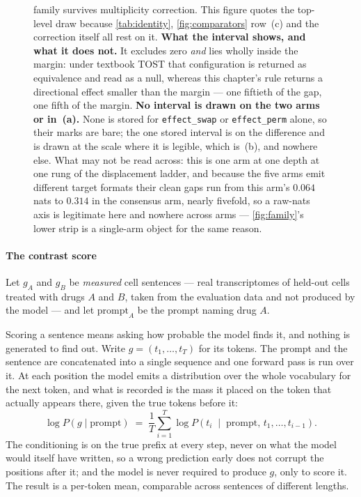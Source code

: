 \begin{figure}[htbp]
{family survives multiplicity correction. This figure quotes the top-level draw
because \cref{tab:identity}, \cref{fig:comparators} row~(c) and the correction
itself all rest on it. \textbf{What the interval shows, and what it does not.}
It excludes zero \emph{and} lies wholly inside the margin: under textbook TOST
that configuration is returned as equivalence and read as a null, whereas this
chapter's rule returns a directional effect smaller than the margin --- one
fiftieth of the gap, one fifth of the margin. \textbf{No interval is drawn on
the two arms or in~(a).} None is stored for \texttt{effect\_swap} or
\texttt{effect\_perm} alone, so their marks are bare; the one stored interval
is on the difference and is drawn at the scale where it is legible, which
is~(b), and nowhere else. What may not be read across: this is one arm at one
depth at one rung of the displacement ladder, and because the five arms emit
different target formats their clean gaps run from this arm's $0.064$ nats to
$0.314$ in the consensus arm, nearly fivefold, so a raw-nats axis is legitimate
here and nowhere across arms --- \cref{fig:family}'s lower strip is a
single-arm object for the same reason.}
\label{fig:materiality}
\end{figure}

\paragraph{The contrast score} Let $g_A$ and $g_B$ be \emph{measured} cell
sentences --- real transcriptomes of held-out cells treated with drugs $A$ and
$B$, taken from the evaluation data and not produced by the model --- and let
$\textrm{prompt}_A$ be the prompt naming drug $A$.

Scoring a sentence means asking how probable the model finds it, and nothing is
generated to find out. Write $g = (t_1, \ldots, t_T)$ for its tokens. The prompt
and the sentence are concatenated into a single sequence and one forward pass is
run over it. At each position the model emits a distribution over the whole
vocabulary for the next token, and what is recorded is the mass it placed on the
token that actually appears there, given the true tokens before it:
\begin{equation}
  \log P\!\left(g \mid \textrm{prompt}\right) \;=\;
  \frac{1}{T} \sum_{i=1}^{T}
  \log P\!\left(t_i \;\middle|\; \textrm{prompt},\, t_1, \ldots, t_{i-1}\right).
\end{equation}
The conditioning is on the true prefix at every step, never on what the model
would itself have written, so a wrong prediction early does not corrupt the
positions after it; and the model is never required to produce $g$, only to
score it. The result is a per-token mean, comparable across sentences of
different lengths.

